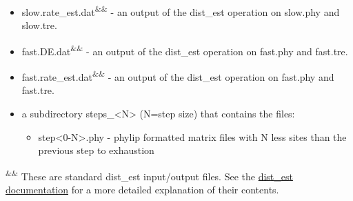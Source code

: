 \documentclass{article}
\begin{document}
\begin{description}
\begin{description}
\begin{itemize}
\begin{itemize}
                        \item  slow.rate\_est.dat\textsuperscript{\&\&} - an output of the dist\_est operation on slow.phy and slow.tre.
                        \item  fast.DE.dat\textsuperscript{\&\&} - an output of the dist\_est operation on fast.phy and fast.tre.
                        \item  fast.rate\_est.dat\textsuperscript{\&\&} - an output of the dist\_est operation on fast.phy and fast.tre.
                        \item a subdirectory steps\_<N> (N=step size) that contains the files:
                        \begin{itemize}
                            \item step<0-N>.phy - phylip formatted matrix files with N less sites than the previous step to exhaustion
                        \end{itemize}
                    \end{itemize}
                \end{itemize}
             \end{description}
        \textsuperscript{\&\&} These are standard dist\_est input/output files. See the \href{http://amoeba.msstate.edu/phylofisher/pdfs/distest.pdf}{dist\_est documentation} for a more detailed explanation of their contents.
        \end{description}
        
        \vspace{0.5cm}
        
\end{document}

